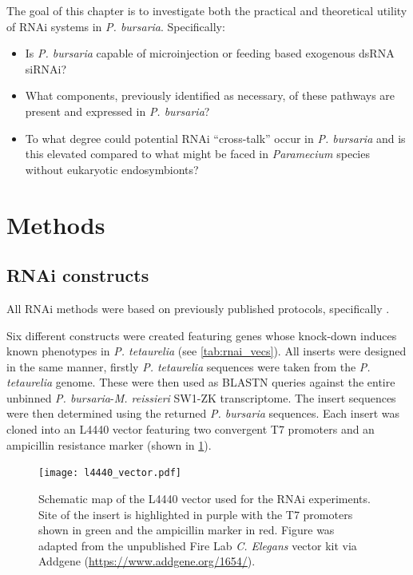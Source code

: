 The goal of this chapter is to investigate both the practical and
theoretical utility of RNAi systems in \textit{P. bursaria}. 
Specifically:
\begin{itemize}
    \item Is \textit{P. bursaria} capable of microinjection or feeding based
        exogenous dsRNA siRNAi?
    \item What components, previously identified as necessary, of these pathways
        are present and expressed in \textit{P. bursaria}? 
    \item To what degree could potential RNAi ``cross-talk'' occur in \textit{P. bursaria} and 
        is this elevated compared to what might be faced in \textit{Paramecium} species
        without eukaryotic endosymbionts?
\end{itemize}


\section{Methods}

\subsection{RNAi constructs}

All RNAi methods were based on previously published protocols, specifically
\citep{Galvani2001,Galvani2002,Beisson2010}.

Six different constructs were created featuring genes whose knock-down
induces known phenotypes in \textit{P. tetaurelia} (see \cref{tab:rnai_vecs}).
All inserts were designed in the same manner, firstly \textit{P. tetaurelia} sequences
were taken from the \textit{P. tetaurelia} genome. 
These were then used as BLASTN queries against the entire unbinned \textit{P. bursaria}-\textit{M. reissieri}
SW1-ZK transcriptome.  The insert sequences were then determined using 
the returned \textit{P. bursaria} sequences.
Each insert was cloned into an L4440 vector featuring two convergent T7 promoters
and an ampicillin resistance marker (shown in \cref{fig:vec_map}). 

\begin{figure}
    \centering
    \texttt{[image: l4440\_vector.pdf]}
    \caption[L4440 RNAi vector map]{Schematic map of the L4440 vector used for the RNAi experiments. Site of the insert is highlighted in purple with the T7 promoters shown in green and the ampicillin marker in red. Figure was adapted from the unpublished Fire Lab \textit{C. Elegans} vector kit via Addgene (\url{https://www.addgene.org/1654/}).}
    \label{fig:vec_map}
\end{figure}


